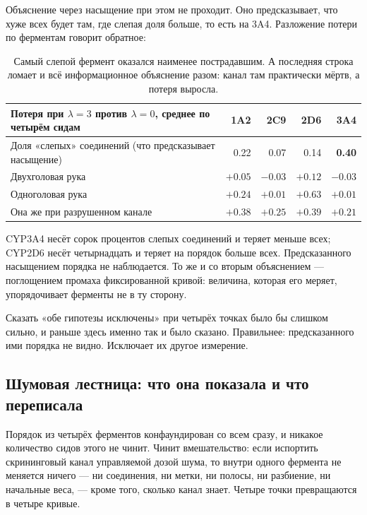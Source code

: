 Объяснение через насыщение при этом не проходит. Оно предсказывает, что хуже всех
будет там, где слепая доля больше, то есть на 3A4. Разложение потери по ферментам говорит
обратное:

\begin{table}[htbp]\centering\small
\begin{tabularx}{\textwidth}{@{}Xrrrr@{}}
\toprule
Потеря при $\lambda = 3$ против $\lambda = 0$, среднее по четырём сидам & 1A2 & 2C9 & 2D6 & 3A4 \\
\midrule
Доля «слепых» соединений (что предсказывает насыщение) & 0.22 & 0.07 & 0.14 & \textbf{0.40} \\
Двухголовая рука   & $+0.05$ & $-0.03$ & $+0.12$ & $-0.03$ \\
Одноголовая рука & $+0.24$ & $+0.01$ & $\mathbf{+0.63}$ & $+0.01$ \\
Она же при разрушенном канале & $+0.38$ & $+0.25$ & $+0.39$ & $+0.21$ \\
\bottomrule
\end{tabularx}
\caption{Самый слепой фермент оказался наименее пострадавшим. А последняя строка ломает и
всё информационное объяснение разом: канал там практически мёртв, а потеря выросла.}
\label{tab:dose}
\end{table}

CYP3A4 несёт сорок процентов слепых соединений и теряет меньше всех; CYP2D6 несёт четырнадцать
и теряет на порядок больше всех. Предсказанного насыщением порядка не наблюдается. То же и со
вторым объяснением --- поглощением промаха фиксированной кривой: величина, которая его меряет,
упорядочивает ферменты не в ту сторону.

Сказать «обе гипотезы исключены» при четырёх точках было бы слишком сильно, и раньше здесь
именно так и было сказано. Правильнее: предсказанного ими порядка не видно. Исключает их
другое измерение.

\subsection{Шумовая лестница: что она показала и что переписала}

Порядок из четырёх ферментов конфаундирован со всем сразу, и никакое количество сидов этого не
чинит. Чинит вмешательство: если испортить скрининговый канал управляемой дозой шума, то внутри
одного фермента не меняется ничего --- ни соединения, ни метки, ни полосы, ни разбиение, ни
начальные веса, --- кроме того, сколько канал знает. Четыре точки превращаются в четыре кривые.

